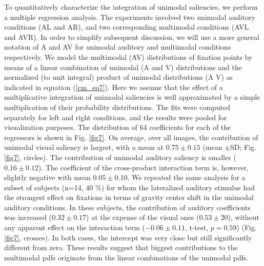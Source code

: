 To quantitatively characterize the integration of unimodal saliencies, we
perform a multiple regression analysis. The experiments involved two
unimodal auditory conditions (AL and AR), and two corresponding multimodal
conditions (AVL and AVR). In order to simplify subsequent discussion, we
will use a more general notation of A and AV for unimodal auditory and
multimodal conditions respectively. We model the multimodal (AV)
distributions of fixation points by means of a linear combination of
unimodal (A and V) distributions and the normalized (to unit integral)
product of unimodal distributions (A \texttimes V) as indicated in equation
(\ref{cm_eq7}). Here we assume that the effect of a multiplicative
integration of unimodal saliencies is well approximated by a simple
multiplication of their probability distributions. The fits were computed
separately for left and right conditions, and the results were pooled for
visualization purposes. The distribution of 64 coefficients for each of the
regressors is shown in Fig. \ref{fig7}. On average, over all images, the
contribution of unimodal visual saliency is largest, with a mean at $0.75
\pm0.15$ (mean $\pm$SD; Fig. \ref{fig7}, circles). The contribution of
unimodal auditory saliency is smaller ($0.16 \pm0.12$). The coefficient of
the cross-product interaction term is, however, slightly negative with mean
$0.05 \pm0.10$. We repeated the same analysis for a subset of subjects
(n=14, 40 \%) for whom the lateralized auditory stimulus had the strongest
effect on fixations in terms of gravity center shift in the unimodal
auditory conditions. In these subjects, the contribution of auditory
coefficients was increased ($0.32 \pm0.17$) at the expense of the visual
ones ($0.53 \pm20$), without any apparent effect on the interaction term
($-0.06 \pm0.11$, t-test, $p = 0.59$) (Fig. \ref{fig7}, crosses). In both
cases, the intercept was very close but still significantly different from
zero. These results suggest that biggest contributions to the multimodal
pdfs originate from the linear combinations of the unimodal pdfs. 

